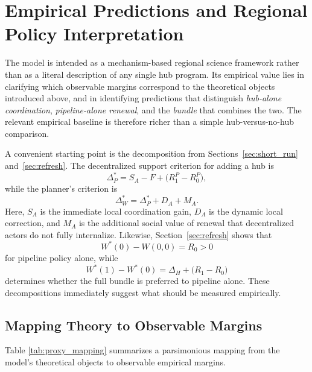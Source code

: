 \section{Empirical Predictions and Regional Policy Interpretation}
\label{sec:policy}

The model is intended as a mechanism-based regional science framework rather than as a literal description of any single hub program. Its empirical value lies in clarifying which observable margins correspond to the theoretical objects introduced above, and in identifying predictions that distinguish \emph{hub-alone coordination}, \emph{pipeline-alone renewal}, and the \emph{bundle} that combines the two. The relevant empirical baseline is therefore richer than a simple hub-versus-no-hub comparison.

A convenient starting point is the decomposition from Sections~\ref{sec:short_run} and~\ref{sec:refresh}. The decentralized support criterion for adding a hub is
\[
\Delta_P^*=S_A-F+\bigl(R_1^P-R_0^P\bigr),
\]
while the planner's criterion is
\[
\Delta_W^*=\Delta_P^*+D_A+M_A.
\]
Here, $S_A$ is the immediate local coordination gain, $D_A$ is the dynamic local correction, and $M_A$ is the additional social value of renewal that decentralized actors do not fully internalize. Likewise, Section~\ref{sec:refresh} shows that
\[
W^*(0)-W(0,0)=R_0>0
\]
for pipeline policy alone, while
\[
W^*(1)-W^*(0)=\Delta_H+\bigl(R_1-R_0\bigr)
\]
determines whether the full bundle is preferred to pipeline alone. These decompositions immediately suggest what should be measured empirically.

\subsection{Mapping Theory to Observable Margins}

Table \ref{tab:proxy_mapping} summarizes a parsimonious mapping from the model's theoretical objects to observable empirical margins.

